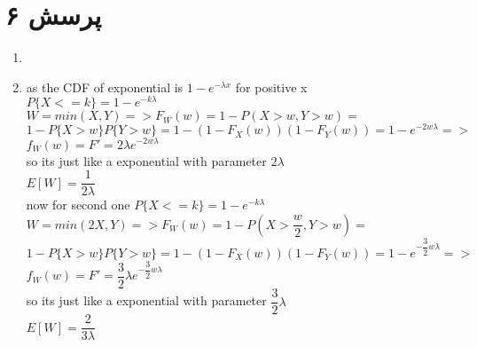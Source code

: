 \documentclass[a4paper]{article}
\begin{document}
\pagebreak

\section*{پرسش ۶}
\pagebreak
\begin{latin}
\begin{enumerate}
\item{}

\item{}
as the CDF of exponential is $1-e^{-\lambda x}$ for positive x\\
$P\{X <= k\} = 1 - e^{-k\lambda}$\\
$W = min(X,Y) => F_W(w) = 1-P(X>w,Y>w)=$\\
$1-P\{X>w\}P\{Y>w\} =1-(1-F_X(w))(1-F_Y(w))=1-e^{-2w\lambda} =>  $\\
$ f_W(w)= F' = 2\lambda e^{-2w\lambda}$\\
so its just like a exponential with parameter $2\lambda$\\
$E[W] = \dfrac{1}{2\lambda}$\\
now for second one
$P\{X <= k\} = 1 - e^{-k\lambda}$\\
$W = min(2X,Y) => F_W(w) = 1-P(X>\dfrac{w}{2},Y>w)=$\\
$1-P\{X>w\}P\{Y>w\} =1-(1-F_X(w))(1-F_Y(w))=1-e^{-\dfrac{3}{2} w\lambda} =>  $\\
$ f_W(w)= F' = \dfrac{3}{2}\lambda e^{-\dfrac{3}{2} w\lambda}$\\
so its just like a exponential with parameter $\dfrac{3}{2}\lambda$\\
$E[W] = \dfrac{2}{3\lambda}$\\
\end{enumerate}
\end{latin}
\end{document}
